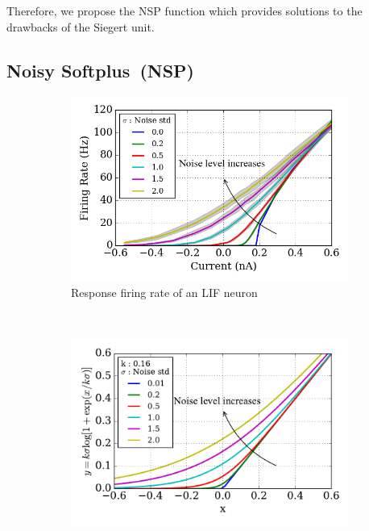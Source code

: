 	Therefore, we propose the NSP function which provides solutions to the drawbacks of the Siegert unit.

		
	\subsection{Noisy Softplus~(NSP)}
	\label{sec:NSP}
	\begin{figure}[bht!]
		\centering
		\begin{subfigure}[t]{0.7\textwidth}
			\includegraphics[width=\textwidth]{pics_iconip/revise_siegert.png}
			\caption{Response firing rate of an LIF neuron}
		\end{subfigure}\\
		\begin{subfigure}[t]{0.7\textwidth}
			\includegraphics[width=\textwidth]{pics_iconip/revise_4.pdf}

\end{subfigure}
\end{figure}
